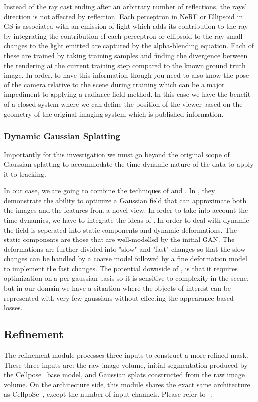 Instead of the ray cast ending after an arbitrary number of reflections, the rays’ direction is not affected by reflection.  Each perceptron in NeRF or Ellipsoid in GS is associated with an emission of light which adds its contribution to the ray by integrating the contribution of each perceptron or ellipsoid to the ray small changes to the light emitted are captured by the alpha-blending equation. Each of these are trained by taking training samples and finding the divergence between the rendering at the current training step compared to the known ground truth image.  In order, to have this information though you need to also know the pose of the camera relative to the scene during training which can be a major impediment to applying a radiance field method. In this case we have the benefit of a closed system where we can define the position of the viewer based on the geometry of the original imaging system which is published information.  \\  

\subsubsection{Dynamic Gaussian Splatting}
\label{sec:related_works_gaussian_splatting}
Importantly for this investigation we must go beyond the original scope of Gaussian splatting to accommodate the time-dynamic nature of the data to apply it to tracking.

In our case, we are going to combine the techniques of \cite{Zhou2023-zg} and \cite{Bae2024-xu}. In \cite{Zhou2023-zg}, they demonstrate the ability to optimize a Gaussian field that can approximate both the images and the features from a novel view. In order to take into account the time-dynamics, we have to integrate the ideas of \cite{Bae2024-xu}. In order to deal with dynamic the field is seperated into static components and dynamic deformations.  The static components are those that are well-modelled by the initial GAN. The deformations are further divided into "slow" and "fast" changes so that the slow changes can be handled by a coarse model followed by a fine deformation model to implement the fast changes.  The potential downside of \cite{Bae2024-xu}, is that it requires optimization on a per-gaussian basis so it is sensitive to complexity in the scene, but in our domain we have a situation where the objects of interest can be represented with very few gaussians without effecting the appearance based losses.

\subsection{Refinement}
The refinement module processes three inputs to construct a more refined mask. These three inputs are: the raw image volume, initial segmentation produced by the Cellpose~\cite{stringer2021cellpose} base model, and Gaussian splats constructed from the raw image volume. On the architecture side, this module shares the exact same architecture as CellpoSe~\cite{stringer2021cellpose}, except the number of input channels. Please refer to ~.

